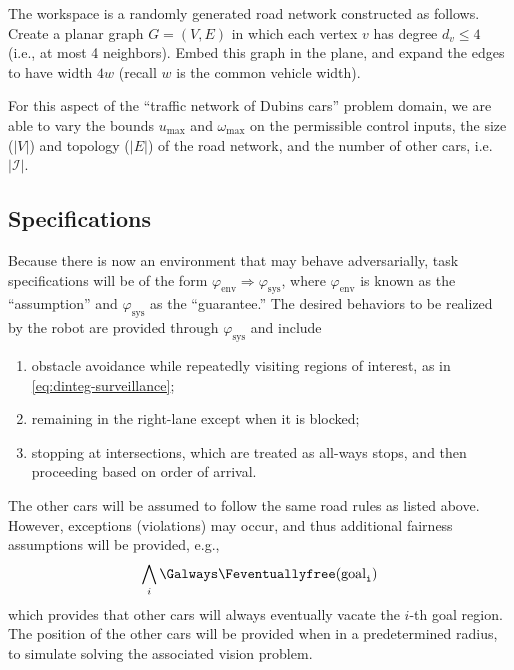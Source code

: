 \documentclass{amsart}
\theoremstyle{definition}
\begin{document}
The workspace is a randomly generated road network constructed as follows.
Create a planar graph $G = (V,E)$ in which each vertex $v$ has degree $d_v \le 4$
(i.e., at most 4 neighbors).  Embed this graph in the plane, and expand the
edges to have width $4w$ (recall $w$ is the common vehicle width).

For this aspect of the ``traffic network of Dubins cars'' problem domain, we are
able to vary the bounds $u_{\mathrm{max}}$ and $\omega_{\mathrm{max}}$ on the
permissible control inputs, the size ($|V|$) and topology ($|E|$) of the road
network, and the number of other cars, i.e. $|\mathcal I|$.


\subsection{Specifications}

Because there is now an environment that may behave adversarially, task
specifications will be of the form $\varphi_{\mathrm{env}} \Rightarrow
\varphi_{\mathrm{sys}}$, where $\varphi_{\mathrm{env}}$ is known as the
``assumption'' and $\varphi_{\mathrm{sys}}$ as the ``guarantee.''  The desired
behaviors to be realized by the robot are provided through
$\varphi_{\mathrm{sys}}$ and include
\begin{enumerate}
\item obstacle avoidance while repeatedly visiting regions of interest, as in
  \eqref{eq:dinteg-surveillance};

\item remaining in the right-lane except when it is blocked;

\item stopping at intersections, which are treated as all-ways stops, and then
  proceeding based on order of arrival.
\end{enumerate}
The other cars will be assumed to follow the same road rules as listed above.
However, exceptions (violations) may occur, and thus additional fairness
assumptions will be provided, e.g.,
\begin{equation}\label{eq:freegoals}
\bigwedge_i \Galways \Feventually \tt{free}(\mathrm{goal}_i)
\end{equation}
which provides that other cars will always eventually vacate the $i$-th goal
region. The position of the other cars will be provided when in a predetermined 
radius, to simulate solving the associated vision problem. 

\end{document}
